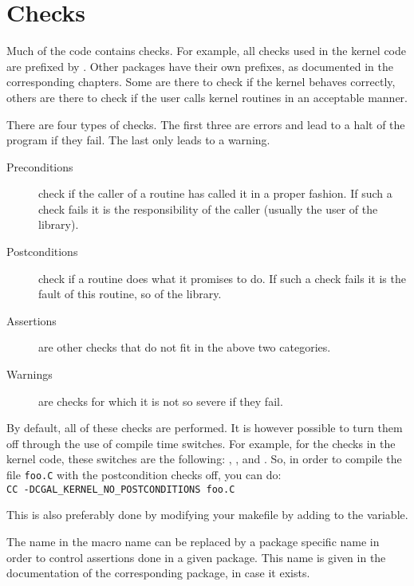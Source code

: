 

\section{Checks}

Much of the {\cgal} code contains checks. 
For example, all checks used in the kernel code are prefixed by 
.
Other packages have their own prefixes, as documented in the corresponding
chapters.
Some are there to check if the kernel behaves correctly, others are there to 
check if the user calls kernel routines in an acceptable manner.

There are four types of checks. 
The first three are errors and lead to a halt of the program if they fail. 
The last only leads to a warning.
\begin{description}
\item[Preconditions] check if the caller of a routine has called it in a
proper fashion. 
If such a check fails it is the responsibility of the caller 
(usually the user of the library).
\item[Postconditions] check if a routine does what it promises to do. 
If such a check fails it is the fault of this routine, so of the library.
\item[Assertions] are other checks that do not fit in the above two 
categories.
\item[Warnings] are checks for which it is not so severe if they fail.
\end{description}

By default, all of these checks are performed. 
It is however possible to turn them off through the use of compile time 
switches.
For example, for the checks in the kernel code, these switches are the 
following:
, 
,
 and 
.
So, in order to compile the file \verb~foo.C~ with the postcondition checks
off, you can do:\\
\verb~CC -DCGAL_KERNEL_NO_POSTCONDITIONS foo.C~

This is also preferably done by modifying your makefile by adding
 to the  variable.

The name  in the macro name can be replaced by a package
specific name in order to control assertions done in a given package.
This name is given in the documentation of the corresponding package,
in case it exists.

